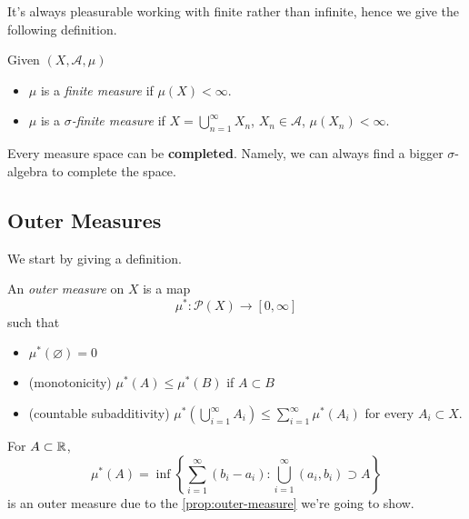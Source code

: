 It's always pleasurable working with finite rather than infinite, hence we give the following definition.
\begin{definition}\label{def:finite-measure}
	Given \((X, \mathcal{A} , \mu)\)
	\begin{itemize}
		\item \(\mu\) is a \emph{finite measure} if \(\mu(X)<\infty \).
		\item \(\mu\) is a \emph{\(\sigma\)-finite measure} if \(X = \bigcup\limits_{n=1}^{\infty} X_{n}\), \(X_{n}\in \mathcal{A} \), \(\mu(X_{n})<\infty \).
	\end{itemize}
\end{definition}

\begin{exercise}
	Every measure space can be \textbf{completed}. Namely, we can always find a bigger \(\sigma\)-algebra to complete the space.
\end{exercise}

\subsection{Outer Measures}
We start by giving a definition.

\begin{definition}\label{def:outer-measure}
	An \emph{outer measure} on \(X\) is a map
	\[
		\mu^{*} \colon \mathcal{P} (X)\to [0, \infty ]
	\]
	such that
	\begin{itemize}
		\item\label{def:outer-measure-empty-measure} \(\mu^{*} (\varnothing ) = 0\)
		\item\label{def:outer-measure-montonicity} (monotonicity) \(\mu^{*} (A)\leq \mu^{*} (B)\) if \(A\subset B\)
		\item\label{def:outer-measure-countable-subadditivity} (countable subadditivity) \(\mu^{*} \left(\bigcup\limits_{i=1}^{\infty} A_{i}\right) \leq \sum\limits_{i=1}^{\infty} \mu^{*} (A_{i})\) for every \(A_{i} \subset X \).
	\end{itemize}
\end{definition}

\begin{eg}
	For \(A\subset\mathbb{\MakeUppercase{R}} \),
	\[
		\mu^{*} (A) = \inf \left\{\sum\limits_{i=1}^{\infty} (b_{i} - a_{i}) \colon \bigcup\limits_{i=1}^{\infty} (a_{i}, b_{i})\supset A\right\}
	\]
	is an outer measure due to the \autoref{prop:outer-measure} we're going to show.
\end{eg}

